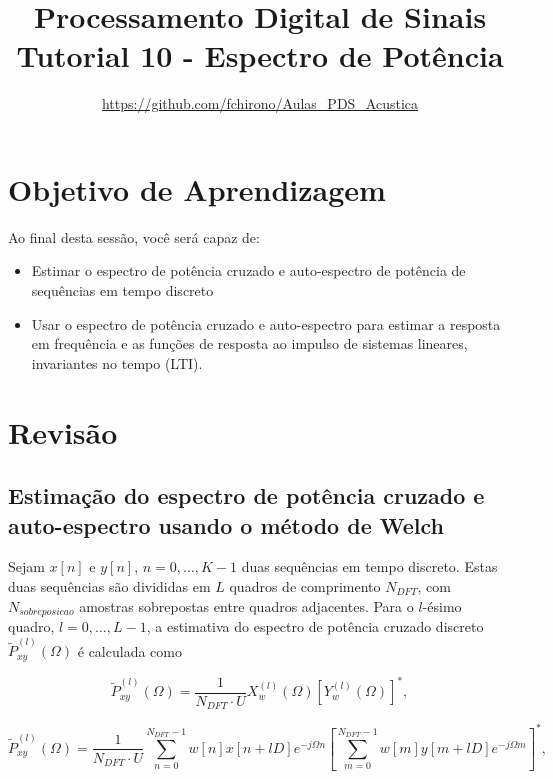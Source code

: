 \documentclass[a4paper,twoside,12pt]{article}
\title{\vspace{-2cm} Processamento Digital de Sinais\\ Tutorial 10 - Espectro de Potência}
\author{\url{https://github.com/fchirono/Aulas_PDS_Acustica}}
\begin{document}
	\date{}
	\maketitle
	
	\section*{Objetivo de Aprendizagem}
	Ao final desta sessão, você será capaz de:
	\begin{itemize}
		\item Estimar o espectro de potência cruzado e auto-espectro de potência de sequências em tempo discreto
		\item Usar o espectro de potência cruzado e auto-espectro para estimar a resposta em frequência e as funções de resposta ao impulso de sistemas lineares, invariantes no tempo (LTI).
	\end{itemize}
	
	\begingroup
	\let\clearpage\relax
	\tableofcontents
	\endgroup
	
	\section{Revisão}
	\subsection{Estimação do espectro de potência cruzado e auto-espectro usando o método de Welch}
	
	Sejam $x[n]$ e $y[n]$, $n = 0, \ldots, K-1$ duas sequências em tempo discreto. Estas duas sequências são divididas em $L$ quadros de comprimento $N_{DFT}$, com $N_{sobreposicao}$ amostras sobrepostas entre quadros adjacentes. Para o $l$-ésimo quadro, $l = 0, \ldots, L-1$, a estimativa do espectro de potência cruzado discreto $\widetilde{P}_{xy}^{(l)}(\Omega)$ é calculada como
	
	\begin{equation}
		\widetilde{P}_{xy}^{(l)}(\Omega) = \frac{1}{N_{DFT} \cdot U} X_w^{(l)}(\Omega ) \left[ Y_w^{(l)}(\Omega ) \right]^*,
	\end{equation}
	
	\begin{equation}
		\widetilde{P}_{xy}^{(l)}(\Omega) = \frac{1}{N_{DFT} \cdot U} \sum_{n=0}^{N_{DFT}-1} w[n] x[n+lD] e^{-j \Omega n} \left[ \sum_{m=0}^{N_{DFT}-1} w[m] y[m+lD] e^{-j \Omega m} \right]^*,
	\end{equation}
	
\end{document}
